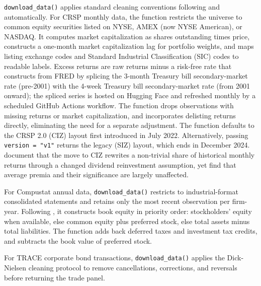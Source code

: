 \documentclass[
  article]{jss}
\begin{document}
\texttt{download\_data()} applies standard cleaning conventions
following \citet{bali.2016} and \citet{scheuch.2023} automatically. For
CRSP monthly data, the function restricts the universe to common equity
securities listed on NYSE, AMEX (now NYSE American), or NASDAQ. It
computes market capitalization as shares outstanding times price,
constructs a one-month market capitalization lag for portfolio weights,
and maps listing exchange codes and Standard Industrial Classification
(SIC) codes to readable labels. Excess returns are raw returns minus a
risk-free rate that  constructs from FRED by splicing
the 3-month Treasury bill secondary-market rate (pre-2001) with the
4-week Treasury bill secondary-market rate (from 2001 onward); the
spliced series is hosted on Hugging Face and refreshed monthly by a
scheduled GitHub Actions workflow. The function drops observations with
missing returns or market capitalization, and incorporates delisting
returns directly, eliminating the need for a separate adjustment. The
function defaults to the CRSP 2.0 (CIZ) layout first introduced in July
2022. Alternatively, passing \texttt{version\ =\ "v1"} returns the
legacy (SIZ) layout, which ends in December 2024. \citet{schwarz.2026}
document that the move to CIZ rewrites a non-trivial share of historical
monthly returns through a changed dividend reinvestment assumption, yet
find that average premia and their significance are largely unaffected.

For Compustat annual data, \texttt{download\_data()} restricts to
industrial-format consolidated statements and retains only the most
recent observation per firm-year. Following \citet{fama.1992}, it
constructs book equity in priority order: stockholders' equity when
available, else common equity plus preferred stock, else total assets
minus total liabilities. The function adds back deferred taxes and
investment tax credits, and subtracts the book value of preferred stock.

For TRACE corporate bond transactions, \texttt{download\_data()} applies
the Dick-Nielsen cleaning protocol \citep{dicknielsen.2009} to remove
cancellations, corrections, and reversals before returning the trade
panel.
\end{document}
